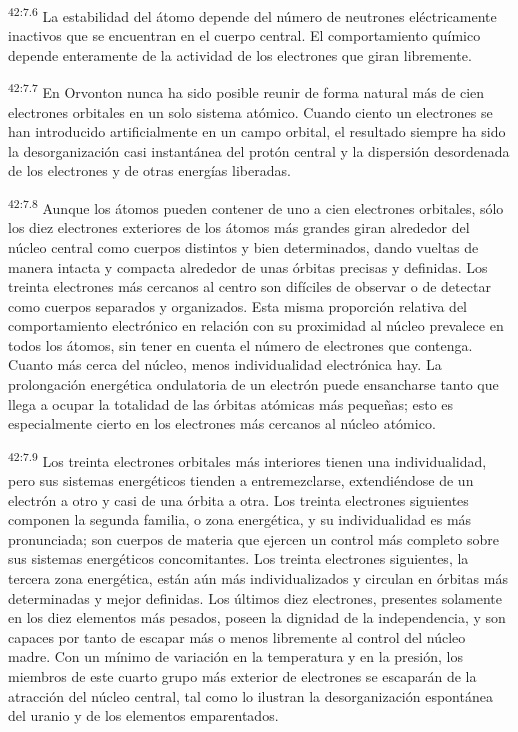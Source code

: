\par
\textsuperscript{42:7.6} La estabilidad del átomo depende del número de neutrones eléctricamente inactivos que se encuentran en el cuerpo central. El comportamiento químico depende enteramente de la actividad de los electrones que giran libremente.

\par
\textsuperscript{42:7.7} En Orvonton nunca ha sido posible reunir de forma natural más de cien electrones orbitales en un solo sistema atómico. Cuando ciento un electrones se han introducido artificialmente en un campo orbital, el resultado siempre ha sido la desorganización casi instantánea del protón central y la dispersión desordenada de los electrones y de otras energías liberadas.

\par
\textsuperscript{42:7.8} Aunque los átomos pueden contener de uno a cien electrones orbitales, sólo los diez electrones exteriores de los átomos más grandes giran alrededor del núcleo central como cuerpos distintos y bien determinados, dando vueltas de manera intacta y compacta alrededor de unas órbitas precisas y definidas. Los treinta electrones más cercanos al centro son difíciles de observar o de detectar como cuerpos separados y organizados. Esta misma proporción relativa del comportamiento electrónico en relación con su proximidad al núcleo prevalece en todos los átomos, sin tener en cuenta el número de electrones que contenga. Cuanto más cerca del núcleo, menos individualidad electrónica hay. La prolongación energética ondulatoria de un electrón puede ensancharse tanto que llega a ocupar la totalidad de las órbitas atómicas más pequeñas; esto es especialmente cierto en los electrones más cercanos al núcleo atómico.

\par
\textsuperscript{42:7.9} Los treinta electrones orbitales más interiores tienen una individualidad, pero sus sistemas energéticos tienden a entremezclarse, extendiéndose de un electrón a otro y casi de una órbita a otra. Los treinta electrones siguientes componen la segunda familia, o zona energética, y su individualidad es más pronunciada; son cuerpos de materia que ejercen un control más completo sobre sus sistemas energéticos concomitantes. Los treinta electrones siguientes, la tercera zona energética, están aún más individualizados y circulan en órbitas más determinadas y mejor definidas. Los últimos diez electrones, presentes solamente en los diez elementos más pesados, poseen la dignidad de la independencia, y son capaces por tanto de escapar más o menos libremente al control del núcleo madre. Con un mínimo de variación en la temperatura y en la presión, los miembros de este cuarto grupo más exterior de electrones se escaparán de la atracción del núcleo central, tal como lo ilustran la desorganización espontánea del uranio y de los elementos emparentados.

